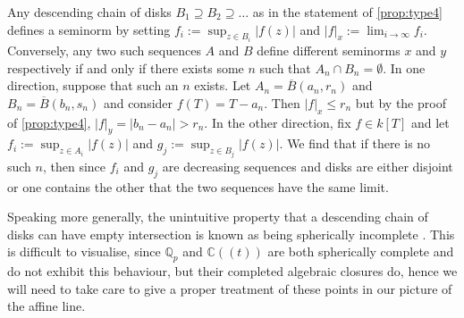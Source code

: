 Any descending chain of disks $B_1 \supseteq B_2 \supseteq \dots $ as in the statement of \cref{prop:type4} defines a seminorm by setting
$f_i := \sup_{z \in B_i} |f(z)|$ and 
$|f|_x := \lim_{i \to \infty} f_i$. Conversely, any two such sequences $A$ and $B$ define different seminorms $x$ and $y$ respectively if and only if there exists some $n$ such that $A_n \cap B_n = \emptyset$. In one direction, suppose that such an $n$ exists. Let $A_n = \overline B(a_n, r_n)$ and $B_n = \overline B(b_n, s_n)$ and consider $f(T) = T - a_n$. Then $|f|_x \leq r_n$ but by the proof of \cref{prop:type4}, ${|f|_y} = {|b_n - a_n| > r_n}$. In the other direction, fix $f \in k[T]$ and let $f_i := \sup_{z \in A_i} |f(z)|$ and $g_j := \sup_{z \in B_j} |f(z)|$. We find that if there is no such $n$, then since $f_i$ and $g_j$ are decreasing sequences and disks are either disjoint or one contains the other that the two sequences have the same limit.

Speaking more generally, the unintuitive property that a descending chain of disks can have empty intersection is known as being spherically incomplete \parencite[\S 1.4.4]{berk1}. This is difficult to visualise, since $\mathbb{Q}_p$ and $\mathbb{C}((t))$ are both spherically complete and do not exhibit this behaviour, but their completed algebraic closures do, hence we will need to take care to give a proper treatment of these points in our picture of the affine line.

